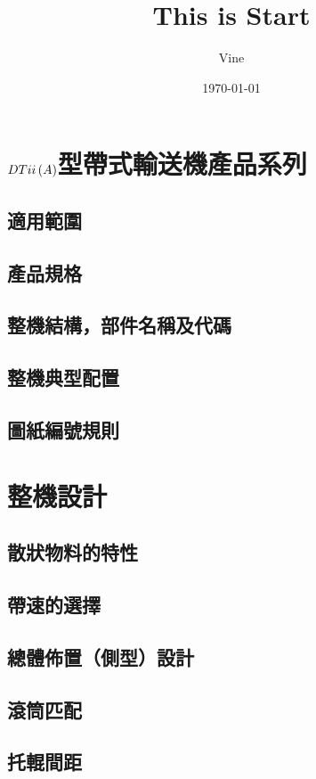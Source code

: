 \documentclass[UTF8]{ctexart}
\title{This is Start}
\author{Vine}
\date{\today}
\newcommand{\Rmnum}[1]{\uppercase\expandafter{\romannumeral #1}}
\newcommand{\mf}[1]{\left( #1\right)}
\begin{document}
\setlength{\headheight}{15pt}
\newpage
\tableofcontents{}
\newpage
\section{$DT\Rmnum{2}\mf{A}$型帶式輸送機產品系列}
\subsection{適用範圍}
\subsection{產品規格}
\subsection{整機結構，部件名稱及代碼}
\subsection{整機典型配置}
\subsection{圖紙編號規則}



\newpage
\section{整機設計}
\subsection{散狀物料的特性}
\subsection{帶速的選擇}
\subsection{總體佈置（側型）設計}
\subsection{滾筒匹配}
\subsection{托輥間距}
 
\end{document}
